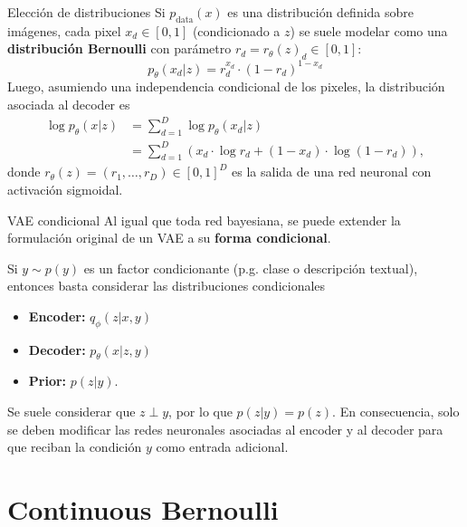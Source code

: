 \documentclass{beamer}
\begin{document}
\begin{frame}{Elección de distribuciones}
    Si $p_\text{data}(x)$ es una distribución definida sobre imágenes, cada pixel $x_d\in[0,1]$ (condicionado a $z$) se suele modelar como una \textbf{distribución Bernoulli} con parámetro $r_d=r_\theta(z)_d\in[0,1]$:
    \begin{equation*}
        p_\theta(x_d|z)=r_d^{x_d}\cdot(1-r_d)^{1-x_d}
    \end{equation*}
    Luego, asumiendo una independencia condicional de los pixeles, la distribución asociada al decoder es
    \begin{align*}
        \log p_\theta(x|z)
         & = \sum_{d=1}^D \log p_\theta(x_d|z)                                     \\
         & = \sum_{d=1}^D \left(x_d\cdot\log r_d + (1-x_d)\cdot\log(1-r_d)\right),
    \end{align*}
    donde $r_\theta(z)=(r_1,\ldots,r_D)\in[0,1]^D$ es la salida de una red neuronal con activación sigmoidal.
\end{frame}

\begin{frame}{VAE condicional}
    Al igual que toda red bayesiana, se puede extender la formulación original de un VAE a su \textbf{forma condicional}.

    Si $y\sim p(y)$ es un factor condicionante (p.g. clase o descripción textual), entonces basta considerar las distribuciones condicionales
    \begin{itemize}
        \item \textbf{Encoder:} $q_\phi(z|x,y)$
        \item \textbf{Decoder:} $p_\theta(x|z,y)$
        \item \textbf{Prior:} $p(z|y)$.
    \end{itemize}
    Se suele considerar que $z\perp y$, por lo que $p(z|y)=p(z)$. En consecuencia, solo se deben modificar las redes neuronales asociadas al encoder y al decoder para que reciban la condición $y$ como entrada adicional.
\end{frame}

\section{Continuous Bernoulli}
\end{document}
